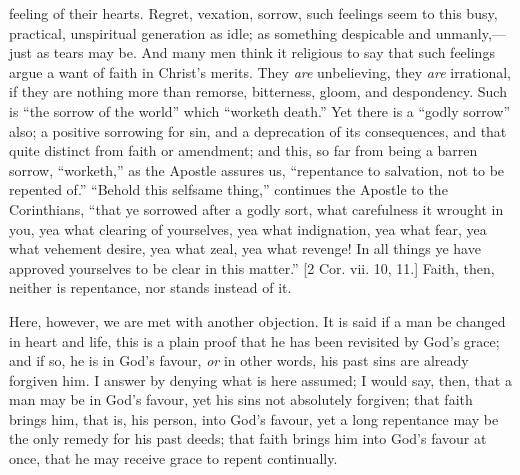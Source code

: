 feeling of their hearts. Regret, vexation, sorrow, such feelings seem
to this busy, practical, unspiritual generation as idle; as something
despicable and unmanly,—just as tears may be. And many men think it
religious to say that such feelings argue a want of faith in Christ's
merits. They \emph{are} unbelieving, they \emph{are} irrational, if
they are nothing more than remorse, bitterness, gloom, and
despondency. Such is ``the sorrow of the world'' which ``worketh
death.'' Yet there is a ``godly sorrow'' also; a positive
sorrowing for sin, and a deprecation of its consequences, and that
quite distinct from faith or amendment; and this, so far from being a
barren sorrow, ``worketh,'' as the Apostle assures us,
``repentance to salvation, not to be repented of.''
``Behold this selfsame thing,'' continues the Apostle to the
Corinthians, ``that ye sorrowed after a godly sort, what
carefulness it wrought in you, yea what clearing of yourselves, yea
what indignation, yea what fear, yea what vehement desire, yea what
zeal, yea what revenge! In all things ye have approved yourselves to
be clear in this matter.'' [2 Cor. vii. 10, 11.] Faith, then,
neither is repentance, nor stands instead of it.

Here, however, we are met with another objection. It is said if a
man be changed in heart and life, this is a plain proof that he has
been revisited by God's grace; and if so, he is in God's favour, \emph{or}
in other words, his past sins are already forgiven him. I answer by
denying what is here assumed; I would say, then, that a man may be in
God's favour, yet his sins not absolutely forgiven; that faith brings
him, that is, his person, into God's favour, yet a long repentance may
be the only remedy for his past deeds; that faith brings him into
God's favour at once, that he may receive grace to repent continually.

